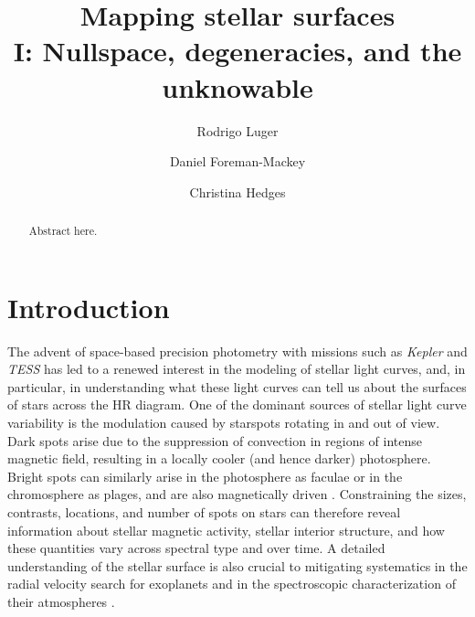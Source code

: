 \documentclass[modern]{aastex62}
\begin{document}
\title{%
    \textbf{
        Mapping stellar surfaces\\
        I: Nullspace, degeneracies, and the unknowable
    }
}

\author[0000-0002-0296-3826]{Rodrigo Luger}
%
\author[0000-0002-9328-5652]{Daniel Foreman-Mackey}
%
\author[0000-0002-3385-8391]{Christina Hedges}
%



\begin{abstract}
    Abstract here.
\end{abstract}

\section{Introduction}
\label{sec:intro}

The advent of space-based precision photometry with missions such as
\emph{Kepler} \citep{Borucki2010} and \emph{TESS} \citep{Ricker2015}
has led to a renewed interest in the modeling of stellar light curves,
and, in particular, in understanding what these light curves can tell
us about the surfaces of stars across the HR diagram. One of the dominant
sources of stellar light curve variability is the modulation caused
by starspots rotating in and out of view.
Dark spots arise due to the suppression of convection in regions of
intense magnetic field, resulting in a locally cooler (and hence darker)
photosphere. Bright spots can similarly
arise in the photosphere as faculae or in the chromosphere as plages, and
are also magnetically driven \citep[e.g.,][]{Berdyugina2005}.
%
Constraining the sizes,
contrasts, locations, and number of spots on stars can therefore reveal
information about stellar magnetic activity, stellar interior structure,
and how these quantities vary across spectral type and over time.
A detailed understanding of the stellar surface is also crucial to
mitigating systematics in the radial velocity search for exoplanets
\citep[e.g.,][]{Lanza2011} and in the spectroscopic characterization of their
atmospheres \citep[e.g.,][]{Rackham2018}.
\end{document}
